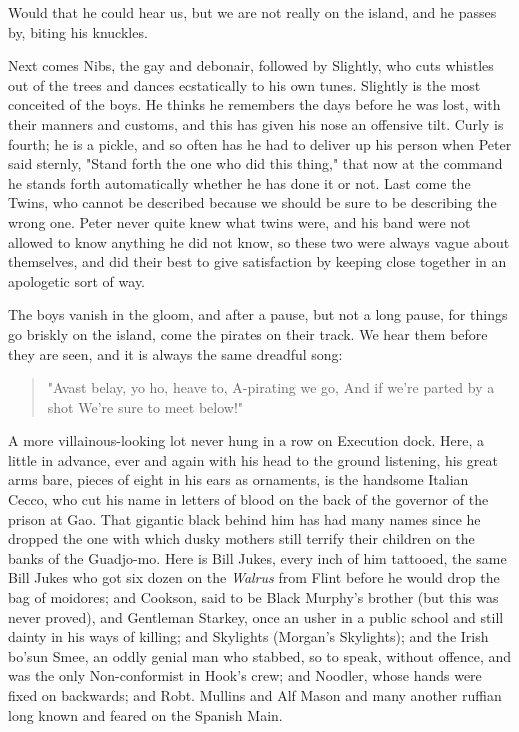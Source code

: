 Would that he could hear us, but we are not really on the island, and he
passes by, biting his knuckles.


Next comes Nibs, the gay and debonair, followed by Slightly, who cuts
whistles out of the trees and dances ecstatically to his own tunes.
Slightly is the most conceited of the boys. He thinks he remembers the
days before he was lost, with their manners and customs, and this has
given his nose an offensive tilt. Curly is fourth; he is a pickle,
and so often has he had to
deliver up his person when Peter said sternly, "Stand forth the one who
did this thing," that now at the command he stands forth automatically
whether he has done it or not. Last come the Twins, who cannot be
described because we should be sure to be describing the wrong one. Peter
never quite knew what twins were, and his band were not allowed to know
anything he did not know, so these two were always vague about themselves,
and did their best to give satisfaction by keeping close together in an
apologetic sort of way.


The boys vanish in the gloom, and after a pause, but not a long pause, for
things go briskly on the island, come the pirates on their track. We hear
them before they are seen, and it is always the same dreadful song:

\begin{verse}
     "Avast belay, yo ho, heave to,
     A-pirating we go,
     And if we're parted by a shot
     We're sure to meet below!"
\end{verse}

A more villainous-looking lot never hung in a row on Execution dock. Here,
a little in advance, ever and again with his head to the ground listening,
his great arms bare, pieces of eight in his ears as ornaments, is the
handsome Italian Cecco, who cut his name in letters of blood on the back
of the governor of the prison at Gao. That gigantic black behind him has
had many names since he dropped the one with which dusky mothers still
terrify their children on the banks of the Guadjo-mo. Here is Bill Jukes,
every inch of him tattooed, the same Bill Jukes who got six dozen on the
\emph{Walrus} from Flint before he would drop the bag of moidores;
and Cookson, said to be Black Murphy's brother (but this was
never proved), and Gentleman Starkey, once an usher in a public school and
still dainty in his ways of killing; and Skylights (Morgan's Skylights);
and the Irish bo'sun Smee, an oddly genial man who stabbed, so to speak,
without offence, and was the only Non-conformist in Hook's crew; and
Noodler, whose hands were fixed on backwards; and Robt. Mullins and Alf
Mason and many another ruffian long known and feared on the Spanish Main.


